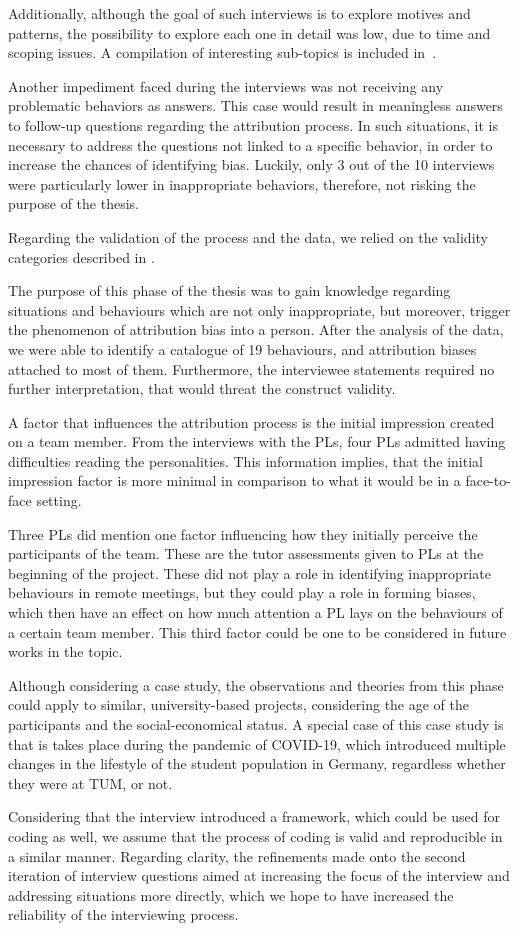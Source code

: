 Additionally, although the goal of such interviews is to explore motives and patterns, the possibility to explore each one in detail was low, due to time and scoping issues. A compilation of interesting sub-topics is included in~.

Another impediment faced during the interviews was not receiving any problematic behaviors as answers. This case would result in meaningless answers to follow-up questions regarding the attribution process. In such situations, it is necessary to address the questions not linked to a specific behavior, in order to increase the chances of identifying bias. Luckily, only 3 out of the 10 interviews were particularly lower in inappropriate behaviors, therefore, not risking the purpose of the thesis.

Regarding the validation of the process and the data, we relied on the validity categories described in \cite{Runeson2012}.

The purpose of this phase of the thesis was to gain knowledge regarding situations and behaviours which are not only inappropriate, but moreover, trigger the phenomenon of attribution bias into a person. After the analysis of the data, we were able to identify a catalogue of 19 behaviours, and attribution biases attached to most of them. Furthermore, the interviewee statements required no further interpretation, that would threat the construct validity.

A factor that influences the attribution process is the initial impression created on a team member.  From the interviews with the PLs, four PLs admitted having difficulties reading the personalities.  This information implies, that the initial impression factor is more minimal in comparison to what it would be in a face-to-face setting.

Three PLs did mention one factor influencing how they initially perceive the participants of the team. These are the tutor assessments given to PLs at the beginning of the project. These did not play a role in identifying inappropriate behaviours in remote meetings, but they could play a role in forming biases, which then have an effect on how much attention a PL lays on the behaviours of a certain team member. This third factor could be one to be considered in future works in the topic.

Although considering a case study, the observations and theories from this phase could apply to similar, university-based projects, considering the age of the participants and the social-economical status. A special case of this case study is that is takes place during the pandemic of COVID-19, which introduced multiple changes in the lifestyle of the student population in Germany, regardless whether they were at TUM, or not.

Considering that the interview introduced a framework, which could be used for coding as well, we assume that the process of coding is valid and reproducible in a similar manner. Regarding clarity, the refinements made onto the second iteration of interview questions aimed at increasing the focus of the interview and addressing situations more directly, which we hope to have increased the reliability of the interviewing process.  